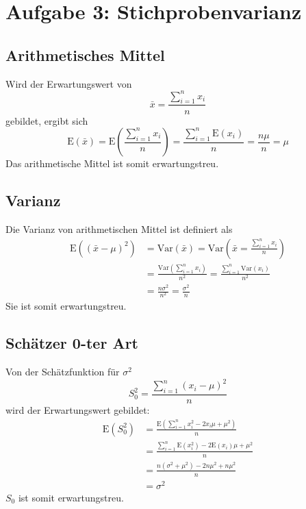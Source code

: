 \section*{Aufgabe 3: Stichprobenvarianz}
\label{sec:Aufgabe3}

\subsection*{Arithmetisches Mittel}
\label{sub:Arithmetisches Mittel}
Wird der Erwartungswert von
\begin{equation}
    \bar{x}=\frac{\sum_{i=1}^nx_i}{n}
\end{equation}
gebildet, ergibt sich
\begin{equation}
    \text{E}(\bar{x})=\text{E}\left(\frac{\sum_{i=1}^nx_i}{n}\right)=\frac{\sum_{i=1}^n\text{E}(x_i)}{n}=\frac{n\mu}{n}=\mu
\end{equation}
Das arithmetische Mittel ist somit erwartungstreu.

\subsection*{Varianz}
\label{sub:Varianz}
Die Varianz von arithmetischen Mittel ist definiert als
\begin{align}
    \text{E}\left((\bar{x}-\mu)^2 \right)&=\text{Var}(\bar{x})=\text{Var}\left(\bar{x}=\frac{\sum_{i=1}^nx_i}{n}\right)\\
    &=\frac{\text{Var}\left(\sum_{i=1}^nx_i\right)}{n^2}=\frac{\sum_{i=1}^n\text{Var}(x_i)}{n^2}\\
    &=\frac{n\sigma^2}{n^2}=\frac{\sigma^2}{n}
\end{align}
Sie ist somit erwartungstreu.

\subsection*{Schätzer 0-ter Art}
\label{sub:Schätzer 0-ter Art}
Von der Schätzfunktion für $\sigma^2$
\begin{equation}
    S_0^2=\frac{\sum_{i=1}^n(x_i-\mu)^2}{n}
\end{equation}
wird der Erwartungswert gebildet:
\begin{align}
    \text{E}(S_0^2)&=\frac{\text{E}\left(\sum_{i=1}^nx_i^2-2x_i\mu +\mu^2\right)}{n}\\
    &=\frac{\sum_{i=1}^n\text{E}(x_i^2)-2\text{E}(x_i)\mu +\mu^2}{n}\\
    &=\frac{n(\sigma^2+\mu^2)-2n\mu^2 +n\mu^2}{n}\\
    &=\sigma^2
\end{align}
$S_0$ ist somit erwartungstreu.